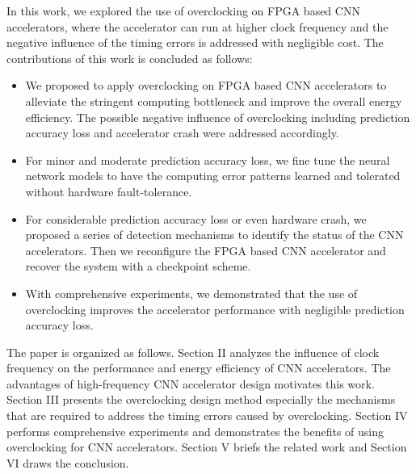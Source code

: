In this work, we explored the use of overclocking on FPGA based 
CNN accelerators, where the accelerator can run at higher 
clock frequency and the negative influence of the timing errors 
is addressed with negligible cost. The contributions of this work is 
concluded as follows:

\begin{itemize}
	\item We proposed to apply overclocking on FPGA based CNN accelerators 
		to alleviate the stringent computing bottleneck and improve the 
		overall energy efficiency. The possible negative influence of 
		overclocking including prediction accuracy loss and accelerator 
		crash were addressed accordingly. 

	\item For minor and moderate prediction accuracy loss, we fine tune the 
		neural network models to have the computing error patterns 
		learned and tolerated without hardware fault-tolerance.

	\item For considerable prediction accuracy loss or even hardware crash, we 
		proposed a series of detection mechanisms to identify the status of 
		the CNN accelerators. Then we reconfigure the FPGA based CNN 
		accelerator and recover the system with a checkpoint scheme.

	\item With comprehensive experiments, we demonstrated that the use 
		of overclocking improves the accelerator performance with negligible 
		prediction accuracy loss.
\end{itemize}

The paper is organized as follows. Section II analyzes the influence of 
clock frequency on the performance and energy efficiency of CNN accelerators.
The advantages of high-frequency CNN accelerator design motivates this work. 
Section III presents the overclocking design method especially the mechanisms 
that are required to address the timing errors caused by overclocking. 
Section IV performs comprehensive experiments and demonstrates the benefits 
of using overclocking for CNN accelerators. Section V briefs the related work 
and Section VI draws the conclusion. 



